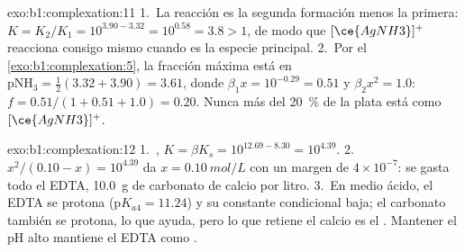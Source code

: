 \begin{solution}{exo:b1:complexation:11}
1.~La reacción es la segunda formación menos la primera: $K = K_2/K_1 =
10^{3.90 - 3.32} = 10^{0.58} = 3.8 > 1$, de modo que $[\ce{AgNH3}]^{+}$
reacciona consigo mismo cuando es la especie principal.
2.~Por el \cref{exo:b1:complexation:5}, la fracción máxima está en
$\mathrm{pNH_3} = \frac12(3.32 + 3.90) = 3.61$, donde $\beta_1 x = 10^{-0.29}
= 0.51$ y $\beta_2x^2 = 1.0$: $f = 0.51/(1 + 0.51 + 1.0) = 0.20$. Nunca
más del \qty{20}{\percent} de la plata está como $[\ce{AgNH3}]^{+}$.
\end{solution}

\begin{solution}{exo:b1:complexation:12}
1.~, $K = \beta K_s = 10^{12.69 -
8.30} = 10^{4.39}$.
2.~$x^2/(0.10 - x) = 10^{4.39}$ da $x = \qty{0.10}{mol/L}$ con un margen
de $4 \times 10^{-7}$: se gasta todo el EDTA, \qty{10.0}{g} de carbonato
de calcio por litro.
3.~En medio ácido, el EDTA se protona ($\mathrm{p}K_{a4} = 11.24$) y su
constante condicional baja; el carbonato también se protona, lo que
ayuda, pero lo que retiene el calcio es el . Mantener el pH alto
mantiene el EDTA como .
\end{solution}

